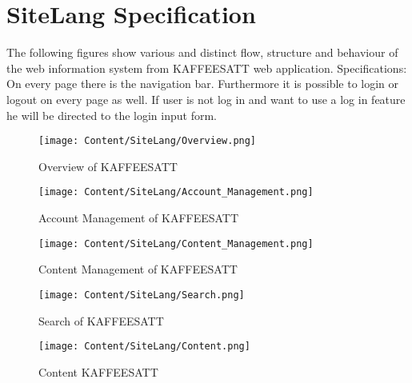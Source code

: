 \section{SiteLang Specification}
The following figures show various and distinct flow, structure and behaviour of the web information system from KAFFEESATT web application.
Specifications: On every page there is the navigation bar. Furthermore it is possible to login or logout on every page as well. If user is not log in and want to use a log in feature he will be directed to the login input form.
\begin{figure}[ht]
\texttt{[image: Content/SiteLang/Overview.png]}
\caption{Overview of KAFFEESATT}
\end{figure}

\begin{figure}[ht]
\texttt{[image: Content/SiteLang/Account\_Management.png]}
\caption{Account Management of KAFFEESATT}
\end{figure}

\begin{figure}[ht]
\texttt{[image: Content/SiteLang/Content\_Management.png]}
\caption{Content Management of KAFFEESATT}
\end{figure}

\begin{figure}[ht]
\texttt{[image: Content/SiteLang/Search.png]}
\caption{Search of KAFFEESATT}
\end{figure}

\begin{figure}[ht]
\texttt{[image: Content/SiteLang/Content.png]}
\caption{Content KAFFEESATT}
\end{figure}
\clearpage



